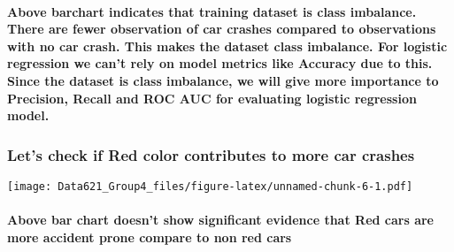 \documentclass[]{article}
\let\oldparagraph\paragraph
\renewcommand{\paragraph}[1]{\oldparagraph{#1}\mbox{}}
\begin{document}
\hypertarget{above-barchart-indicates-that-training-dataset-is-class-imbalance.-there-are-fewer-observation-of-car-crashes-compared-to-observations-with-no-car-crash.-this-makes-the-dataset-class-imbalance.-for-logistic-regression-we-cant-rely-on-model-metrics-like-accuracy-due-to-this.-since-the-dataset-is-class-imbalance-we-will-give-more-importance-to-precision-recall-and-roc-auc-for-evaluating-logistic-regression-model.}{%
\paragraph{Above barchart indicates that training dataset is class
imbalance. There are fewer observation of car crashes compared to
observations with no car crash. This makes the dataset class imbalance.
For logistic regression we can't rely on model metrics like Accuracy due
to this. Since the dataset is class imbalance, we will give more
importance to Precision, Recall and ROC AUC for evaluating logistic
regression
model.}\label{above-barchart-indicates-that-training-dataset-is-class-imbalance.-there-are-fewer-observation-of-car-crashes-compared-to-observations-with-no-car-crash.-this-makes-the-dataset-class-imbalance.-for-logistic-regression-we-cant-rely-on-model-metrics-like-accuracy-due-to-this.-since-the-dataset-is-class-imbalance-we-will-give-more-importance-to-precision-recall-and-roc-auc-for-evaluating-logistic-regression-model.}}

\hypertarget{lets-check-if-red-color-contributes-to-more-car-crashes}{%
\subsubsection{\texorpdfstring{\textbf{Let's check if Red color
contributes to more car
crashes}}{Let's check if Red color contributes to more car crashes}}\label{lets-check-if-red-color-contributes-to-more-car-crashes}}

\texttt{[image: Data621\_Group4\_files/figure-latex/unnamed-chunk-6-1.pdf]}

\hypertarget{above-bar-chart-doesnt-show-significant-evidence-that-red-cars-are-more-accident-prone-compare-to-non-red-cars}{%
\paragraph{Above bar chart doesn't show significant evidence that Red
cars are more accident prone compare to non red
cars}\label{above-bar-chart-doesnt-show-significant-evidence-that-red-cars-are-more-accident-prone-compare-to-non-red-cars}}
\end{document}
